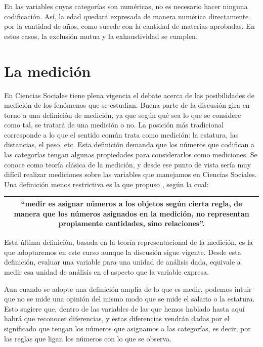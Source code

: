 \documentclass[]{book}
\begin{document}
En las variables cuyas categorías son numéricas, no es necesario hacer ninguna codificación. Así, la edad quedará expresada de manera numérica directamente por la cantidad de años, como sucede con la cantidad de materias aprobadas. En estos casos, la exclusión mutua y la exhaustividad se cumplen.

\hypertarget{la-medicion}{%
\section{La medición}\label{la-medicion}}

En Ciencias Sociales tiene plena vigencia el debate acerca de las posibilidades de medición de los fenómenos que se estudian. Buena parte de la discusión gira en torno a una definición de medición, ya que según qué sea lo que se considere como tal, se tratará de una medición o no. La posición más tradicional corresponde a lo que el sentido común trata como medición: la estatura, las distancias, el peso, etc. Esta definición demanda que los números que codifican a las categorías tengan algunas propiedades para considerarlos como mediciones. Se conoce como teoría clásica de la medición, y desde ese punto de vista sería muy difícil realizar mediciones sobre las variables que manejamos en Ciencias Sociales. Una definición menos restrictiva es la que propuso \citet{Stevens1946}, según la cual:

\begin{longtable}[]{@{}c@{}}
\toprule
\endhead
\begin{minipage}[t]{0.97\columnwidth}\centering
``medir es asignar números a los objetos según cierta regla, de manera que los números asignados en la medición, no representan propiamente cantidades, sino relaciones''.\strut
\end{minipage}\tabularnewline
\bottomrule
\end{longtable}

Esta última definición, basada en la teoría representacional de la medición, es la que adoptaremos en este curso aunque la discusión sigue vigente. Desde esta definición, evaluar una variable para una unidad de análisis dada, equivale a medir esa unidad de análisis en el aspecto que la variable expresa.

Aun cuando se adopte una definición amplia de lo que es medir, podemos intuir que no se mide una opinión del mismo modo que se mide el salario o la estatura. Esto sugiere que, dentro de las variables de las que hemos hablado hasta aquí habrá que reconocer diferencias, y estas diferencias vendrán dadas por el significado que tengan los números que asignamos a las categorías, es decir, por las reglas que ligan los números con lo que se observa.
\end{document}

